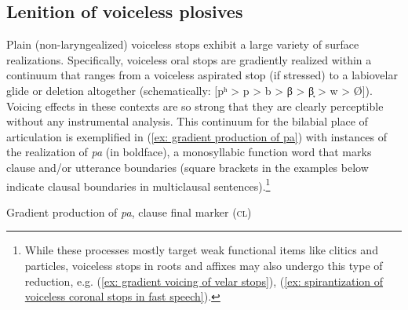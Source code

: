 \subsection{Lenition of voiceless plosives}
\label{subsec: lenition of voiceless plosives}

Plain (non-laryngealized) voiceless stops exhibit a large variety of surface realizations. Specifically, voiceless oral stops are gradiently realized within a continuum that ranges from a voiceless aspirated stop (if stressed) to a labiovelar glide or deletion altogether (schematically: [pʰ > p > b > β > β̞ > w > Ø]). Voicing effects in these contexts are so strong that they are clearly perceptible without any instrumental analysis. This continuum for the bilabial place of articulation is exemplified in (\ref{ex: gradient production of pa}) with instances of the realization of \textit{pa} (in boldface), a monosyllabic function word that marks clause and/or utterance boundaries (square brackets in the examples below indicate clausal boundaries in multiclausal sentences).\footnote{While these processes mostly target weak functional items like clitics and particles, voiceless stops in roots and affixes may also undergo this type of reduction, e.g. (\ref{ex: gradient voicing of velar stops}), (\ref{ex: spirantization of voiceless coronal stops in fast speech}).}


\ea\label{ex: gradient production of pa}
{Gradient production of \textit{pa}, clause final marker (\textsc{cl)}}


